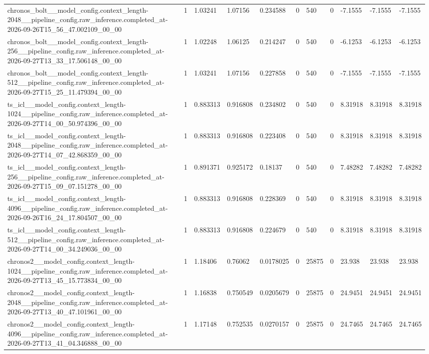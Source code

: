 \begin{tabular}{lllllllllll}
chronos\_bolt\_\_model\_config.context\_length-2048\_\_pipeline\_config.raw\_inference.completed\_at-2026-09-26T15\_56\_47.002109\_00\_00 & 1 & 1.03241 & 1.07156 & 0.234588 & 0 & 540 & 0 & -7.1555 & -7.1555 & -7.1555 \\
chronos\_bolt\_\_model\_config.context\_length-256\_\_pipeline\_config.raw\_inference.completed\_at-2026-09-27T13\_33\_17.506148\_00\_00 & 1 & 1.02248 & 1.06125 & 0.214247 & 0 & 540 & 0 & -6.1253 & -6.1253 & -6.1253 \\
chronos\_bolt\_\_model\_config.context\_length-512\_\_pipeline\_config.raw\_inference.completed\_at-2026-09-27T15\_25\_11.479394\_00\_00 & 1 & 1.03241 & 1.07156 & 0.227858 & 0 & 540 & 0 & -7.1555 & -7.1555 & -7.1555 \\
ts\_icl\_\_model\_config.context\_length-1024\_\_pipeline\_config.raw\_inference.completed\_at-2026-09-27T14\_00\_50.974396\_00\_00 & 1 & 0.883313 & 0.916808 & 0.234802 & 0 & 540 & 0 & 8.31918 & 8.31918 & 8.31918 \\
ts\_icl\_\_model\_config.context\_length-2048\_\_pipeline\_config.raw\_inference.completed\_at-2026-09-27T14\_07\_42.868359\_00\_00 & 1 & 0.883313 & 0.916808 & 0.223408 & 0 & 540 & 0 & 8.31918 & 8.31918 & 8.31918 \\
ts\_icl\_\_model\_config.context\_length-256\_\_pipeline\_config.raw\_inference.completed\_at-2026-09-27T15\_09\_07.151278\_00\_00 & 1 & 0.891371 & 0.925172 & 0.18137 & 0 & 540 & 0 & 7.48282 & 7.48282 & 7.48282 \\
ts\_icl\_\_model\_config.context\_length-4096\_\_pipeline\_config.raw\_inference.completed\_at-2026-09-26T16\_24\_17.804507\_00\_00 & 1 & 0.883313 & 0.916808 & 0.228369 & 0 & 540 & 0 & 8.31918 & 8.31918 & 8.31918 \\
ts\_icl\_\_model\_config.context\_length-512\_\_pipeline\_config.raw\_inference.completed\_at-2026-09-27T14\_00\_34.249036\_00\_00 & 1 & 0.883313 & 0.916808 & 0.224679 & 0 & 540 & 0 & 8.31918 & 8.31918 & 8.31918 \\
chronos2\_\_model\_config.context\_length-1024\_\_pipeline\_config.raw\_inference.completed\_at-2026-09-27T13\_45\_15.773834\_00\_00 & 1 & 1.18406 & 0.76062 & 0.0178025 & 0 & 25875 & 0 & 23.938 & 23.938 & 23.938 \\
chronos2\_\_model\_config.context\_length-2048\_\_pipeline\_config.raw\_inference.completed\_at-2026-09-27T13\_40\_47.101961\_00\_00 & 1 & 1.16838 & 0.750549 & 0.0205679 & 0 & 25875 & 0 & 24.9451 & 24.9451 & 24.9451 \\
chronos2\_\_model\_config.context\_length-4096\_\_pipeline\_config.raw\_inference.completed\_at-2026-09-27T13\_41\_04.346888\_00\_00 & 1 & 1.17148 & 0.752535 & 0.0270157 & 0 & 25875 & 0 & 24.7465 & 24.7465 & 24.7465 \\

\end{tabular}

